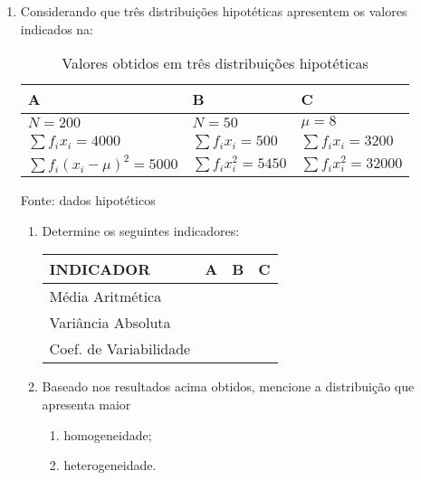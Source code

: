 \begin{enumerate}
\item Considerando que três distribuições hipotéticas apresentem os valores indicados na:
	\begin{table}[!htb]
	\centering
	\caption{Valores obtidos em três distribuições hipotéticas}
	\vspace{0.5cm}
	\begin{tabular}{lll}
	\hline 
	A  & B & C \\
	\hline 
	$ N = 200 $ & $ N = 50 $ &  $ \mu = 8 $ \\
	$ \sum f_{i}x_{i} = 4000$ & $ \sum f_{i}x_{i} = 500$ & $ \sum f_{i}x_{i} = 3200$ \\
	$ \sum f_{i}(x_{i}-\mu)^2 = 5000$ & $ \sum f_{i}x_{i}^2 = 5450$ & $ \sum f_{i}x_{i}^2 = 32000$ \\
	 \hline 
	\end{tabular}
	\newline Fonte: dados hipotéticos
	\end{table}
	\begin{enumerate}
		\item Determine os seguintes indicadores:
			\begin{table}[!htb]
			\begin{tabular}{llll}
			\hline 
			INDICADOR & A & B & C  \\
			\hline 
			Média Aritmética &     &     &      \\
			Variância  Absoluta &     &     &      \\
			Coef. de Variabilidade &     &     &      \\			 \hline 
			\end{tabular}
			\end{table}
		\item Baseado nos resultados acima obtidos, mencione a distribuição que apresenta maior
			\begin{enumerate}
				\item homogeneidade;
				\item heterogeneidade.
			\end{enumerate} 
		\end{enumerate} 


\end{enumerate}
